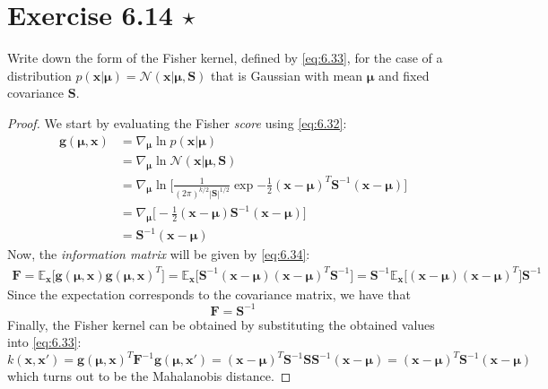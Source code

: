 \section*{Exercise 6.14 $\star$}
Write down the form of the Fisher kernel, defined by \eqref{eq:6.33},
for the case of a distribution 
$p(\mathbf{x} | \bm{\mu}) = \mathcal{N}(\mathbf{x} | \bm{\mu}, \mathbf{S})$ 
that is Gaussian with mean $\bm{\mu}$ and fixed covariance $\mathbf{S}$.

\vspace{1em}

\begin{proof}
    We start by evaluating the Fisher \emph{score} using \eqref{eq:6.32}:
    \begin{align*}
        \mathbf{g}(\bm{\mu}, \mathbf{x})
        &= \nabla_{\bm{\mu}} \ln p(\mathbf{x} | \bm{\mu}) \\
        &= \nabla_{\bm{\mu}} \ln \mathcal{N}(\mathbf{x} | \bm{\mu}, \mathbf{S}) \\
        &= \nabla_{\bm{\mu}} \ln \bigg[\frac{1}{(2\pi)^{k/2} |\mathbf{S}|^{1/2}}
        \exp{-\frac{1}{2}(\mathbf{x} - \bm{\mu})^T \mathbf{S}^{-1}(\mathbf{x} - \bm{\mu})}\bigg] \\
        &= \nabla_{\bm{\mu}} \bigg[-\frac{1}{2}(\mathbf{x} - \bm{\mu}) 
            \mathbf{S}^{-1} (\mathbf{x} - \bm{\mu})\bigg] \\
        &= \mathbf{S}^{-1}(\mathbf{x} - \bm{\mu})
    \end{align*}
    Now, the \emph{information matrix} will be given by \eqref{eq:6.34}:
    \begin{align*}
        \mathbf{F} 
        = \mathbb{E}_{\mathbf{x}}\big[\mathbf{g}(\bm{\mu}, \mathbf{x}) 
        \mathbf{g}(\bm{\mu}, \mathbf{x})^T\big]
        = \mathbb{E}_{\mathbf{x}}\big[\mathbf{S}^{-1}
        (\mathbf{x} - \bm{\mu})(\mathbf{x} - \bm{\mu})^T \mathbf{S}^{-1}\big]
        = \mathbf{S}^{-1} \mathbb{E}_{\mathbf{x}}\big[
        (\mathbf{x} - \bm{\mu})(\mathbf{x} - \bm{\mu})^T\big] \mathbf{S}^{-1}
    \end{align*}
    Since the expectation corresponds to the covariance matrix, we have that
    \[
        \mathbf{F} = \mathbf{S}^{-1}
    \] 
    Finally, the Fisher kernel can be obtained by substituting the obtained values
    into \eqref{eq:6.33}:
    \[
        k(\mathbf{x}, \mathbf{x}')
        = \mathbf{g}(\bm{\mu}, \mathbf{x})^T \mathbf{F}^{-1} \mathbf{g}(\bm{\mu}, \mathbf{x}')
        = (\mathbf{x} - \bm{\mu})^T \mathbf{S}^{-1} \mathbf{S} \mathbf{S}^{-1} (\mathbf{x} - \bm{\mu})
        = (\mathbf{x} - \bm{\mu})^T \mathbf{S}^{-1} (\mathbf{x} - \bm{\mu})
    \] 
    which turns out to be the Mahalanobis distance.
\end{proof}

